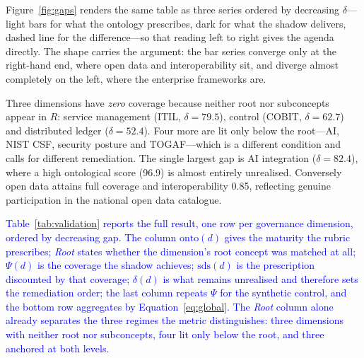 \documentclass[engproc,proceedingpaper,submit,moreauthors]{Definitions/mdpi}
\begin{document}
    Figure~\ref{fig:gaps} renders the same table as three series ordered by decreasing $\delta$---light bars for what the ontology prescribes, dark for what the shadow delivers, dashed line for the difference---so that reading left to right gives the agenda directly. The shape carries the argument: the bar series converge only at the right-hand end, where open data and interoperability sit, and diverge almost completely on the left, where the enterprise frameworks are.

    Three dimensions have \emph{zero} coverage because neither root nor subconcepts appear in $R$: service management (ITIL, $\delta=79.5$), control (COBIT, $\delta=62.7$) and distributed ledger ($\delta=52.4$). Four more are lit only below the root---AI, NIST CSF, security posture and TOGAF---which is a different condition and calls for different remediation. The single largest gap is AI integration ($\delta=82.4$), where a high ontological score (96.9) is almost entirely unrealised. Conversely open data attains full coverage and interoperability 0.85, reflecting genuine participation in the national open data catalogue.

    \textcolor{blue}{Table~\ref{tab:validation} reports the full result, one row per governance dimension, ordered by decreasing gap. The column $\mathrm{onto}(d)$ gives the maturity the rubric prescribes; \emph{Root} states whether the dimension's root concept was matched at all; $\Psi(d)$ is the coverage the shadow achieves; $\mathrm{sds}(d)$ is the prescription discounted by that coverage; $\delta(d)$ is what remains unrealised and therefore sets the remediation order; the last column repeats $\Psi$ for the synthetic control, and the bottom row aggregates by Equation~\eqref{eq:global}. The \emph{Root} column alone already separates the three regimes the metric distinguishes: three dimensions with neither root nor subconcepts, four lit only below the root, and three anchored at both levels.}
\end{document}
